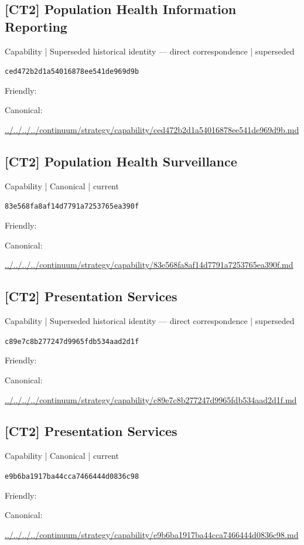 \documentclass[10pt,a4paper]{article}
\begin{document}
\subsection*{[CT2] Population Health Information Reporting}
{\small Capability | Superseded historical identity — direct correspondence | superseded}\par
\texttt{ced472b2d1a54016878ee541de969d9b}\par
Friendly: \par
Canonical: \par
{\footnotesize\url{../../../../continuum/strategy/capability/ced472b2d1a54016878ee541de969d9b.md}}\par
\subsection*{[CT2] Population Health Surveillance}
{\small Capability | Canonical | current}\par
\texttt{83e568fa8af14d7791a7253765ea390f}\par
Friendly: \par
Canonical: \par
{\footnotesize\url{../../../../continuum/strategy/capability/83e568fa8af14d7791a7253765ea390f.md}}\par
\subsection*{[CT2] Presentation Services}
{\small Capability | Superseded historical identity — direct correspondence | superseded}\par
\texttt{c89e7c8b277247d9965fdb534aad2d1f}\par
Friendly: \par
Canonical: \par
{\footnotesize\url{../../../../continuum/strategy/capability/c89e7c8b277247d9965fdb534aad2d1f.md}}\par
\subsection*{[CT2] Presentation Services}
{\small Capability | Canonical | current}\par
\texttt{e9b6ba1917ba44cca7466444d0836c98}\par
Friendly: \par
Canonical: \par
{\footnotesize\url{../../../../continuum/strategy/capability/e9b6ba1917ba44cca7466444d0836c98.md}}\par
\end{document}
